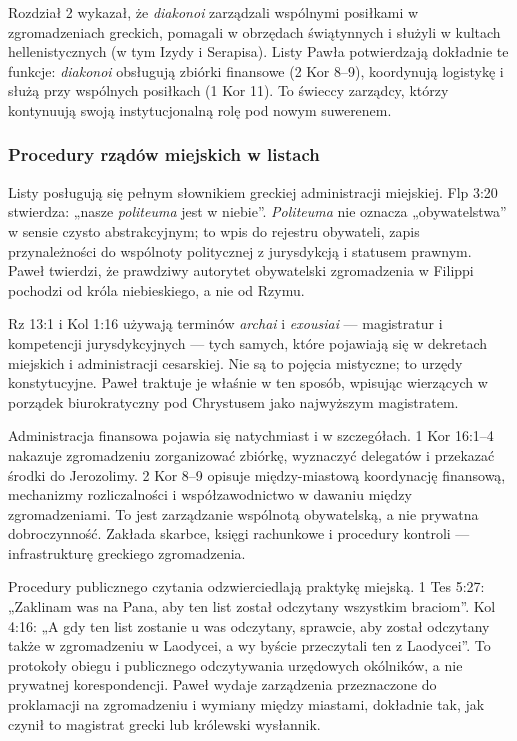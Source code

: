 Rozdział 2 wykazał, że \textit{diakonoi} zarządzali wspólnymi posiłkami w zgromadzeniach greckich, pomagali w obrzędach świątynnych i służyli w kultach hellenistycznych (w tym Izydy i Serapisa).
Listy Pawła potwierdzają dokładnie te funkcje: \textit{diakonoi} obsługują zbiórki finansowe (2 Kor 8–9), koordynują logistykę i służą przy wspólnych posiłkach (1 Kor 11).
To świeccy zarządcy, którzy kontynuują swoją instytucjonalną rolę pod nowym suwerenem.

\subsubsection{Procedury rządów miejskich w listach}\label{subsubsec:civic-governance-procedures-in-the-epistles}

Listy posługują się pełnym słownikiem greckiej administracji miejskiej.
Flp 3:20 stwierdza: „nasze \textit{politeuma} jest w niebie”.
\textit{Politeuma} nie oznacza „obywatelstwa” w sensie czysto abstrakcyjnym; to wpis do rejestru obywateli, zapis przynależności do wspólnoty politycznej z jurysdykcją i statusem prawnym.
Paweł twierdzi, że prawdziwy autorytet obywatelski zgromadzenia w Filippi pochodzi od króla niebieskiego, a nie od Rzymu.

Rz 13:1 i Kol 1:16 używają terminów \textit{archai} i \textit{exousiai} — magistratur i kompetencji jurysdykcyjnych — tych samych, które pojawiają się w dekretach miejskich i administracji cesarskiej.
Nie są to pojęcia mistyczne; to urzędy konstytucyjne.
Paweł traktuje je właśnie w ten sposób, wpisując wierzących w porządek biurokratyczny pod Chrystusem jako najwyższym magistratem.

Administracja finansowa pojawia się natychmiast i w szczegółach.
1 Kor 16:1–4 nakazuje zgromadzeniu zorganizować zbiórkę, wyznaczyć delegatów i przekazać środki do Jerozolimy.
2 Kor 8–9 opisuje między-miastową koordynację finansową, mechanizmy rozliczalności i współzawodnictwo w dawaniu między zgromadzeniami.
To jest zarządzanie wspólnotą obywatelską, a nie prywatna dobroczynność.
Zakłada skarbce, księgi rachunkowe i procedury kontroli — infrastrukturę greckiego zgromadzenia.

Procedury publicznego czytania odzwierciedlają praktykę miejską.
1 Tes 5:27: „Zaklinam was na Pana, aby ten list został odczytany wszystkim braciom”.
Kol 4:16: „A gdy ten list zostanie u was odczytany, sprawcie, aby został odczytany także w zgromadzeniu w Laodycei, a wy byście przeczytali ten z Laodycei”.
To protokoły obiegu i publicznego odczytywania urzędowych okólników, a nie prywatnej korespondencji.
Paweł wydaje zarządzenia przeznaczone do proklamacji na zgromadzeniu i wymiany między miastami, dokładnie tak, jak czynił to magistrat grecki lub królewski wysłannik.

